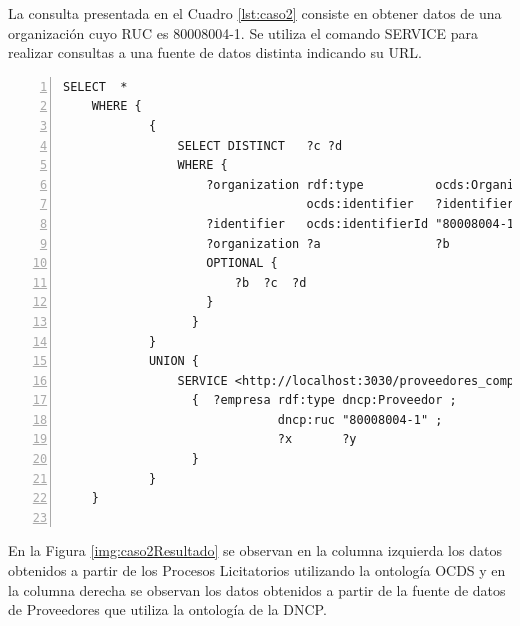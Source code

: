 La consulta presentada en el Cuadro \ref{lst:caso2} consiste en obtener datos de una organización cuyo RUC es 80008004-1. Se utiliza el comando SERVICE para realizar consultas a una fuente de datos distinta indicando su URL.

\noindent\begin{minipage}[c]{\textwidth}
\begin{lstlisting}[captionpos=b, caption={Consulta a dos fuentes de de datos}, label={lst:caso2},  numbers=left,  numberstyle=\tiny\color{mygray},frame=single]
SELECT  *
    WHERE {   
            { 
                SELECT DISTINCT   ?c ?d
                WHERE { 
                    ?organization rdf:type          ocds:Organization ;
                                  ocds:identifier   ?identifier .
                    ?identifier   ocds:identifierId "80008004-1" .
                    ?organization ?a                ?b
                    OPTIONAL { 
                        ?b  ?c  ?d 
                    }
                  }
            }
            UNION {
                SERVICE <http://localhost:3030/proveedores_completas_no_inf/sparql>
                  {  ?empresa rdf:type dncp:Proveedor ;
                              dncp:ruc "80008004-1" ;
                              ?x       ?y
                  }
            }
    }
    
 \end{lstlisting}
\end{minipage}

 En la Figura \ref{img:caso2Resultado} se observan en la columna izquierda los datos obtenidos a partir de los Procesos Licitatorios utilizando la ontología OCDS y en la columna derecha se observan los datos obtenidos a partir de la fuente de datos de Proveedores que utiliza la ontología de la DNCP.


